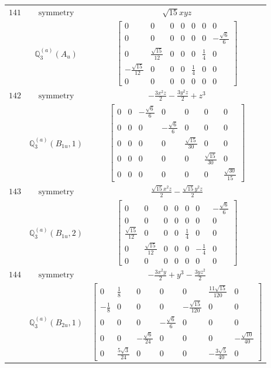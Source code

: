 \documentclass[fleqn,8pt,landscape]{jsarticle}
\begin{document}
\begin{longtable}{ccc}
$ 141 $ & $ \text{symmetry} $ & $ \sqrt{15} x y z $ \\
$  $ & $ \mathbb{Q}_{3}^{(a)}(A_{u}) $ & $ \begin{bmatrix} 0 & 0 & 0 & 0 & 0 & 0 & 0 \\ 0 & 0 & 0 & 0 & 0 & 0 & - \frac{\sqrt{6}}{6} \\ 0 & \frac{\sqrt{15}}{12} & 0 & 0 & 0 & \frac{1}{4} & 0 \\ - \frac{\sqrt{15}}{12} & 0 & 0 & 0 & \frac{1}{4} & 0 & 0 \\ 0 & 0 & 0 & 0 & 0 & 0 & 0 \end{bmatrix} $ \\ \hline
$ 142 $ & $ \text{symmetry} $ & $ - \frac{3 x^{2} z}{2} - \frac{3 y^{2} z}{2} + z^{3} $ \\
$  $ & $ \mathbb{Q}_{3}^{(a)}(B_{1u},1) $ & $ \begin{bmatrix} 0 & 0 & - \frac{\sqrt{6}}{6} & 0 & 0 & 0 & 0 \\ 0 & 0 & 0 & - \frac{\sqrt{6}}{6} & 0 & 0 & 0 \\ 0 & 0 & 0 & 0 & \frac{\sqrt{15}}{30} & 0 & 0 \\ 0 & 0 & 0 & 0 & 0 & \frac{\sqrt{15}}{30} & 0 \\ 0 & 0 & 0 & 0 & 0 & 0 & \frac{\sqrt{30}}{15} \end{bmatrix} $ \\ \hline
$ 143 $ & $ \text{symmetry} $ & $ \frac{\sqrt{15} x^{2} z}{2} - \frac{\sqrt{15} y^{2} z}{2} $ \\
$  $ & $ \mathbb{Q}_{3}^{(a)}(B_{1u},2) $ & $ \begin{bmatrix} 0 & 0 & 0 & 0 & 0 & 0 & - \frac{\sqrt{6}}{6} \\ 0 & 0 & 0 & 0 & 0 & 0 & 0 \\ \frac{\sqrt{15}}{12} & 0 & 0 & 0 & \frac{1}{4} & 0 & 0 \\ 0 & \frac{\sqrt{15}}{12} & 0 & 0 & 0 & - \frac{1}{4} & 0 \\ 0 & 0 & 0 & 0 & 0 & 0 & 0 \end{bmatrix} $ \\ \hline
$ 144 $ & $ \text{symmetry} $ & $ - \frac{3 x^{2} y}{2} + y^{3} - \frac{3 y z^{2}}{2} $ \\
$  $ & $ \mathbb{Q}_{3}^{(a)}(B_{2u},1) $ & $ \begin{bmatrix} 0 & \frac{1}{8} & 0 & 0 & 0 & \frac{11 \sqrt{15}}{120} & 0 \\ - \frac{1}{8} & 0 & 0 & 0 & - \frac{\sqrt{15}}{120} & 0 & 0 \\ 0 & 0 & 0 & - \frac{\sqrt{6}}{6} & 0 & 0 & 0 \\ 0 & 0 & - \frac{\sqrt{6}}{24} & 0 & 0 & 0 & - \frac{\sqrt{10}}{40} \\ 0 & \frac{5 \sqrt{3}}{24} & 0 & 0 & 0 & - \frac{3 \sqrt{5}}{40} & 0 \end{bmatrix} $ \\ \hline

\end{longtable}
\end{document}
